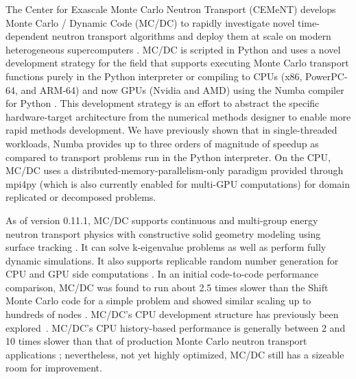 The Center for Exascale Monte Carlo Neutron Transport (CEMeNT) develops Monte Carlo / Dynamic Code (MC/DC) to rapidly investigate novel time-dependent neutron transport algorithms and deploy them at scale on modern heterogeneous supercomputers \cite{morgan_monte_2024}.
MC/DC is scripted in Python and uses a novel development strategy for the field that supports executing Monte Carlo transport functions purely in the Python interpreter or compiling to CPUs (x86, PowerPC-64, and ARM-64) \cite{variansyah_mc23_mcdc} and now GPUs (Nvidia and AMD) using the Numba compiler for Python \cite{lam_numba_2015}.
This development strategy is an effort to abstract the specific hardware-target architecture from the numerical methods designer to enable more rapid methods development.
We have previously shown that in single-threaded workloads, Numba provides up to three orders of magnitude of speedup as compared to transport problems run in the Python interpreter.
On the CPU, MC/DC uses a distributed-memory-parallelism-only paradigm provided through mpi4py \cite{dalcin_mpi4py_2021} (which is also currently enabled for multi-GPU computations) for domain replicated or decomposed problems.

As of version 0.11.1, MC/DC supports continuous and multi-group energy neutron transport physics with constructive solid geometry modeling using surface tracking \cite{transport_cement_mcdc_2024}.
It can solve k-eigenvalue problems as well as perform fully dynamic simulations.
It also supports replicable random number generation for CPU and GPU side computations \cite{rngseed}.
In an initial code-to-code performance comparison, MC/DC was found to run about 2.5 times slower than the Shift Monte Carlo code for a simple problem and showed similar scaling up to hundreds of nodes \cite{variansyah_mc23_mcdc}.
MC/DC's CPU development structure has previously been explored~\cite{morgan_monte_2024, variansyah_mc23_mcdc, morgan2022}.
MC/DC's CPU history-based performance is generally between 2 and 10 times slower than that of production Monte Carlo neutron transport applications \cite{variansyah_mc23_mcdc}; nevertheless, not yet highly optimized, MC/DC still has a sizeable room for improvement.

